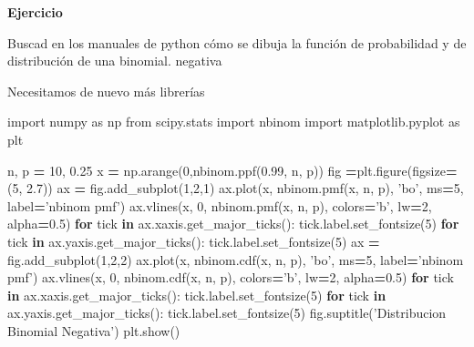 \documentclass[]{book}
\newenvironment{Shaded}{\begin{snugshade}}{\end{snugshade}}
\newcommand{\ControlFlowTok}[1]{\textcolor[rgb]{0.13,0.29,0.53}{\textbf{#1}}}
\newcommand{\DecValTok}[1]{\textcolor[rgb]{0.00,0.00,0.81}{#1}}
\newcommand{\FloatTok}[1]{\textcolor[rgb]{0.00,0.00,0.81}{#1}}
\newcommand{\ImportTok}[1]{#1}
\newcommand{\KeywordTok}[1]{\textcolor[rgb]{0.13,0.29,0.53}{\textbf{#1}}}
\newcommand{\NormalTok}[1]{#1}
\newcommand{\OperatorTok}[1]{\textcolor[rgb]{0.81,0.36,0.00}{\textbf{#1}}}
\newcommand{\StringTok}[1]{\textcolor[rgb]{0.31,0.60,0.02}{#1}}
\begin{document}
\textbf{Ejercicio}

Buscad en los manuales de python cómo se dibuja la función de probabilidad y de distribución de una binomial.
negativa

Necesitamos de nuevo más librerías

\begin{Shaded}
\begin{Highlighting}[]
\ImportTok{import}\NormalTok{ numpy }\ImportTok{as}\NormalTok{ np}
\ImportTok{from}\NormalTok{ scipy.stats }\ImportTok{import}\NormalTok{ nbinom}
\ImportTok{import}\NormalTok{ matplotlib.pyplot }\ImportTok{as}\NormalTok{ plt}
\end{Highlighting}
\end{Shaded}

\begin{Shaded}
\begin{Highlighting}[]
\NormalTok{n, p }\OperatorTok{=} \DecValTok{10}\NormalTok{, }\FloatTok{0.25}
\NormalTok{x }\OperatorTok{=}\NormalTok{ np.arange(}\DecValTok{0}\NormalTok{,nbinom.ppf(}\FloatTok{0.99}\NormalTok{, n, p))}
\NormalTok{fig }\OperatorTok{=}\NormalTok{plt.figure(figsize}\OperatorTok{=}\NormalTok{(}\DecValTok{5}\NormalTok{, }\FloatTok{2.7}\NormalTok{))}
\NormalTok{ax }\OperatorTok{=}\NormalTok{ fig.add_subplot(}\DecValTok{1}\NormalTok{,}\DecValTok{2}\NormalTok{,}\DecValTok{1}\NormalTok{)}
\NormalTok{ax.plot(x, nbinom.pmf(x, n, p), }\StringTok{'bo'}\NormalTok{, ms}\OperatorTok{=}\DecValTok{5}\NormalTok{, label}\OperatorTok{=}\StringTok{'nbinom pmf'}\NormalTok{)}
\NormalTok{ax.vlines(x, }\DecValTok{0}\NormalTok{, nbinom.pmf(x, n, p), colors}\OperatorTok{=}\StringTok{'b'}\NormalTok{, lw}\OperatorTok{=}\DecValTok{2}\NormalTok{, alpha}\OperatorTok{=}\FloatTok{0.5}\NormalTok{)}
\ControlFlowTok{for}\NormalTok{ tick }\KeywordTok{in}\NormalTok{ ax.xaxis.get_major_ticks():}
\NormalTok{  tick.label.set_fontsize(}\DecValTok{5}\NormalTok{)}
\ControlFlowTok{for}\NormalTok{ tick }\KeywordTok{in}\NormalTok{ ax.yaxis.get_major_ticks():}
\NormalTok{  tick.label.set_fontsize(}\DecValTok{5}\NormalTok{) }
\NormalTok{ax }\OperatorTok{=}\NormalTok{ fig.add_subplot(}\DecValTok{1}\NormalTok{,}\DecValTok{2}\NormalTok{,}\DecValTok{2}\NormalTok{)}
\NormalTok{ax.plot(x, nbinom.cdf(x, n, p), }\StringTok{'bo'}\NormalTok{, ms}\OperatorTok{=}\DecValTok{5}\NormalTok{, label}\OperatorTok{=}\StringTok{'nbinom pmf'}\NormalTok{)}
\NormalTok{ax.vlines(x, }\DecValTok{0}\NormalTok{, nbinom.cdf(x, n, p), colors}\OperatorTok{=}\StringTok{'b'}\NormalTok{, lw}\OperatorTok{=}\DecValTok{2}\NormalTok{, alpha}\OperatorTok{=}\FloatTok{0.5}\NormalTok{)}
\ControlFlowTok{for}\NormalTok{ tick }\KeywordTok{in}\NormalTok{ ax.xaxis.get_major_ticks():}
\NormalTok{  tick.label.set_fontsize(}\DecValTok{5}\NormalTok{)}
\ControlFlowTok{for}\NormalTok{ tick }\KeywordTok{in}\NormalTok{ ax.yaxis.get_major_ticks():}
\NormalTok{  tick.label.set_fontsize(}\DecValTok{5}\NormalTok{)}
\NormalTok{fig.suptitle(}\StringTok{'Distribucion Binomial Negativa'}\NormalTok{)}
\NormalTok{plt.show()}
\end{Highlighting}
\end{Shaded}
\end{document}
